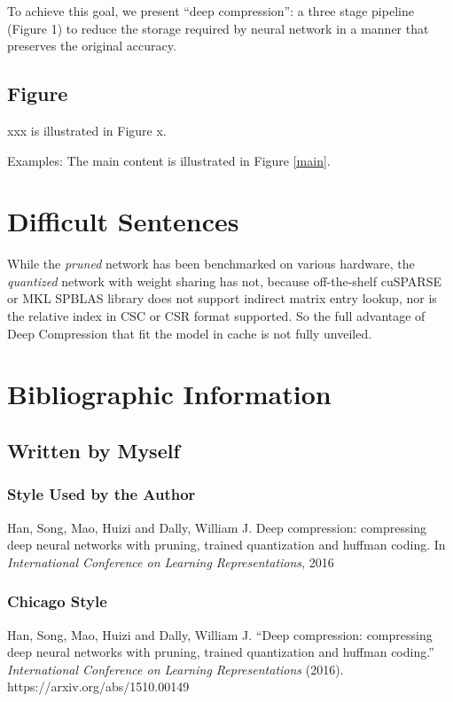 \documentclass{article} %
\begin{document}
To achieve this goal, we present “deep compression”: a three stage pipeline (Figure 1) 
to reduce the storage required by neural network in a manner that preserves the 
original accuracy.

\subsection{Figure}

xxx is illustrated in Figure x.

Examples: The main content is illustrated in Figure \ref{main}.

\section{Difficult Sentences}

While the \emph{pruned} network has been benchmarked on various hardware, 
the \emph{quantized} network with weight sharing has not, because off-the-shelf 
cuSPARSE or MKL SPBLAS library does not support indirect matrix entry lookup, nor is 
the relative index in CSC or CSR format supported. So the full
advantage of Deep Compression that fit the model in cache is not fully unveiled. 

\section{Bibliographic Information}

\subsection{Written by Myself}

\subsubsection{Style Used by the Author}
Han, Song, Mao, Huizi and Dally, William J. Deep compression: compressing 
deep neural networks with pruning, trained quantization and huffman coding. 
In \emph{International Conference on Learning Representations}, 2016

\subsubsection{Chicago Style}
Han, Song, Mao, Huizi and Dally, William J. ``Deep compression: compressing 
deep neural networks with pruning, trained quantization and huffman coding.'' 
\emph{International Conference on Learning Representations} (2016). https://arxiv.org/abs/1510.00149
\end{document}
